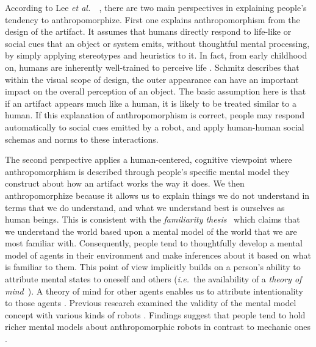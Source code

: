 \documentclass{sig-alternate-2013}
\newcommand{\etal}{{\textit{et al.~}}}
\newcommand{\ie}{{\textit{i.e.~}}}
\begin{document}
According to Lee \etal~\cite{lee_human_2005}, there are two main perspectives in
explaining people's tendency to anthropomorphize. First one explains
anthropomorphism from the design of the artifact. It assumes that humans
directly respond to life-like or social cues that an object or system emits,
without thoughtful mental processing, by simply applying stereotypes and
heuristics to it. In fact, from early childhood on, humans are inherently
well-trained to perceive life \cite{epley_seeing_2007}. Schmitz
\cite{schmitz_concepts_2011} describes that within the visual scope of design,
the outer appearance can have an important impact on the overall perception of
an object. The basic assumption here is that if an artifact appears much like a
human, it is likely to be treated similar to a human. If this explanation of
anthropomorphism is correct, people may respond automatically to social cues
emitted by a robot, and apply human-human social schemas and norms to these
interactions.

The second perspective applies a human-centered, cognitive viewpoint where
anthropomorphism is described through people's specific mental model they
construct about how an artifact works the way it does.  We then anthropomorphize
because it allows us to explain things we do not understand in terms that we do
understand, and what we understand best is ourselves as human beings. This is
consistent with the \emph{familiarity thesis}~\cite{hegel_understanding_2008}
which claims that we understand the world based upon a mental model of the world
that we are most familiar with. Consequently, people tend to thoughtfully
develop a mental model of agents in their environment and make inferences about
it based on what is familiar to them. This point of view implicitly builds on a
person's ability to attribute mental states to oneself and others (\ie the
availability of a \emph{theory of mind}~\cite{premack1978does}). A theory of
mind for other agents enables us to attribute intentionality to those agents
\cite{leslie_pretense_1987,admoni_multi-category_2012}. Previous research
examined the validity of the mental model concept with various kinds of robots
\cite{schmitz_concepts_2011,kiesler_mental_2002}. Findings suggest that people
tend to hold richer mental models about anthropomorphic robots in contrast to
mechanic ones \cite{kiesler_mental_2002}.
\end{document}
